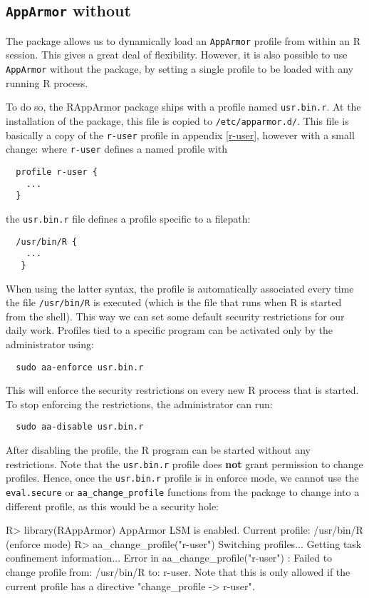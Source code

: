 \documentclass{jss}
\newcommand{\R}{\textsf{R}\xspace}
\newcommand{\AppArmor}{\texttt{AppArmor}\xspace}
\newcommand{\RAppArmor}{\pkg{RAppArmor}\xspace}
\begin{document}
\subsection[AppArmor without RAppArmor]{\AppArmor without \RAppArmor}
\label{usr.bin.r}

The \RAppArmor package allows us to dynamically load an \AppArmor profile
from within an \R session. This gives a great deal of flexibility. However, it
is also possible to use \AppArmor without the \RAppArmor package, by setting a
single profile to be loaded with any running \R process.

To do so, the RAppArmor package ships with a profile named \texttt{usr.bin.r}.
At the installation of the package, this file is copied to \texttt{/etc/apparmor.d/}.
This file is basically a copy of the \texttt{r-user} profile in appendix
\ref{r-user}, however with a small change: where \texttt{r-user} defines
a named profile with
\begin{verbatim}
  profile r-user {
    ...
  }
\end{verbatim}
the \texttt{usr.bin.r} file defines a profile specific to a filepath:
\begin{verbatim}
  /usr/bin/R {
    ...
   }
\end{verbatim}

When using the latter syntax, the profile is automatically associated every time
the file \texttt{/usr/bin/R} is executed (which is the file that runs when
\R is started from the shell). This way we can set some default security
restrictions for our daily work. Profiles tied to a specific program can be
activated only by the administrator using:
\begin{verbatim}
  sudo aa-enforce usr.bin.r
\end{verbatim}
This will enforce the security restrictions on every new \R process that is
started. To stop enforcing the restrictions, the administrator can run:
\begin{verbatim}
  sudo aa-disable usr.bin.r
\end{verbatim}
After disabling the profile, the \R program can be started without any
restrictions.
Note that the \texttt{usr.bin.r} profile does \textbf{not} grant permission to
change profiles. Hence, once the \texttt{usr.bin.r} profile is in enforce mode,
we cannot use the \texttt{eval.secure} or \texttt{aa\_change\_profile} functions
from the \RAppArmor package to change into a different profile, as this
would be a security hole:

\begin{CodeChunk}
\begin{CodeInput}
R> library(RAppArmor)
AppArmor LSM is enabled.
Current profile: /usr/bin/R (enforce mode)
R> aa_change_profile("r-user")
Switching profiles...
Getting task confinement information...
Error in aa_change_profile("r-user") : 
  Failed to change profile from: /usr/bin/R to: r-user.
  Note that this is only allowed if the current profile has a
  directive "change_profile -> r-user".
\end{CodeInput}
\end{CodeChunk}
\end{document}
